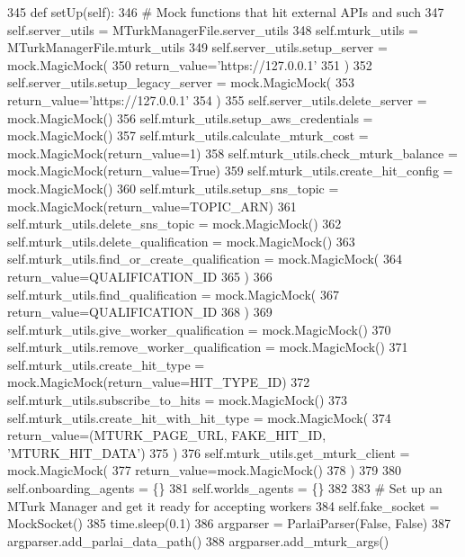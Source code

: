 \begin{DoxyCode}
345     \textcolor{keyword}{def }setUp(self):
346         \textcolor{comment}{# Mock functions that hit external APIs and such}
347         self.server\_utils = MTurkManagerFile.server\_utils
348         self.mturk\_utils = MTurkManagerFile.mturk\_utils
349         self.server\_utils.setup\_server = mock.MagicMock(
350             return\_value=\textcolor{stringliteral}{'https://127.0.0.1'}
351         )
352         self.server\_utils.setup\_legacy\_server = mock.MagicMock(
353             return\_value=\textcolor{stringliteral}{'https://127.0.0.1'}
354         )
355         self.server\_utils.delete\_server = mock.MagicMock()
356         self.mturk\_utils.setup\_aws\_credentials = mock.MagicMock()
357         self.mturk\_utils.calculate\_mturk\_cost = mock.MagicMock(return\_value=1)
358         self.mturk\_utils.check\_mturk\_balance = mock.MagicMock(return\_value=\textcolor{keyword}{True})
359         self.mturk\_utils.create\_hit\_config = mock.MagicMock()
360         self.mturk\_utils.setup\_sns\_topic = mock.MagicMock(return\_value=TOPIC\_ARN)
361         self.mturk\_utils.delete\_sns\_topic = mock.MagicMock()
362         self.mturk\_utils.delete\_qualification = mock.MagicMock()
363         self.mturk\_utils.find\_or\_create\_qualification = mock.MagicMock(
364             return\_value=QUALIFICATION\_ID
365         )
366         self.mturk\_utils.find\_qualification = mock.MagicMock(
367             return\_value=QUALIFICATION\_ID
368         )
369         self.mturk\_utils.give\_worker\_qualification = mock.MagicMock()
370         self.mturk\_utils.remove\_worker\_qualification = mock.MagicMock()
371         self.mturk\_utils.create\_hit\_type = mock.MagicMock(return\_value=HIT\_TYPE\_ID)
372         self.mturk\_utils.subscribe\_to\_hits = mock.MagicMock()
373         self.mturk\_utils.create\_hit\_with\_hit\_type = mock.MagicMock(
374             return\_value=(MTURK\_PAGE\_URL, FAKE\_HIT\_ID, \textcolor{stringliteral}{'MTURK\_HIT\_DATA'})
375         )
376         self.mturk\_utils.get\_mturk\_client = mock.MagicMock(
377             return\_value=mock.MagicMock()
378         )
379 
380         self.onboarding\_agents = \{\}
381         self.worlds\_agents = \{\}
382 
383         \textcolor{comment}{# Set up an MTurk Manager and get it ready for accepting workers}
384         self.fake\_socket = MockSocket()
385         time.sleep(0.1)
386         argparser = ParlaiParser(\textcolor{keyword}{False}, \textcolor{keyword}{False})
387         argparser.add\_parlai\_data\_path()
388         argparser.add\_mturk\_args()

\end{DoxyCode}
